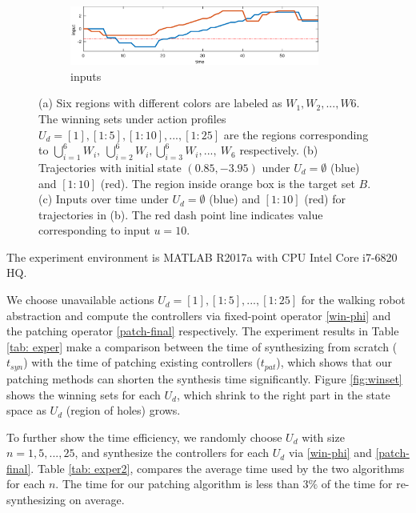 \begin{figure}
\begin{subfigure}[b]{0.25\textwidth}
		\includegraphics[width=0.9\textwidth]{pic/input}
		\caption{inputs}
		\label{fig:input}
	\end{subfigure}
	\caption{(a) Six regions with different colors are labeled as $ W_1,W_2,...,W6 $. The winning sets under action profiles $U_d = [1], [1:5],[1:10],...,[1:25]$ are the regions corresponding to $ \bigcup_{i=1}^6 W_i,\ \bigcup_{i=2}^6 W_i,\bigcup_{i=3}^6 W_i,...,\ W_6 $ respectively. (b) Trajectories with initial state $ (0.85,-3.95) $ under $ U_d = \emptyset $ (blue) and $[1:10] $ (red). The region inside orange box is the target set $ B $. (c) Inputs over time under $ U_d = \emptyset $ (blue) and $ [1:10] $ (red) for trajectories in (b). The red dash point line indicates value corresponding to input $ u = 10 $.} %
\end{figure}

The experiment environment is MATLAB R2017a with CPU Intel Core  i7-6820 HQ.

We choose unavailable actions $ U_d= [1],[1:5],...,[1:25] $ for the { \color{black} walking} robot abstraction and compute the controllers via fixed-point operator \eqref{win-phi} and the patching operator \eqref{patch-final} respectively.  The experiment results in Table \ref{tab: exper} make a comparison between the time of synthesizing from scratch ($ t_{syn} $) with the time of patching existing controllers ($ t_{pat} $), which shows that our patching methods can shorten the synthesis time significantly. Figure \ref{fig:winset} shows the winning sets for each $ U_d $, which shrink to the right part in the state space as $ U_d $ (region of holes) grows.

To further show the time efficiency, we randomly choose $ U_d $ with size $n = 1,5,...,25 $, and synthesize the controllers for each $ U_d $ via \eqref{win-phi} and \eqref{patch-final}. Table \ref{tab: exper2}, compares the average time used by the two algorithms for each $ n $. The time for our patching algorithm is less than $ 3\% $ of the time for re-synthesizing on average.

